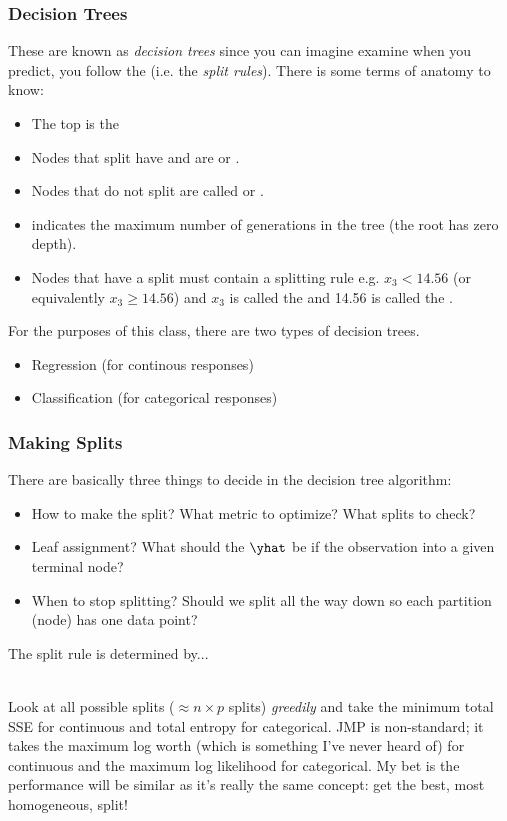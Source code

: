 \documentclass[handout]{beamer}
\begin{document}
\begin{frame}\frametitle{Decision Trees}
\small
These are known as \emph{decision trees} since you can imagine examine when you predict, you follow the  (i.e. the \emph{split rules}). There is some terms of anatomy to know:

\begin{itemize}
\item The top is the 
\item Nodes that split have  and are  or .
\item Nodes that do not split are called  or .
\item {} indicates the maximum number of generations in the tree (the root has zero depth).
\item Nodes that have a split must contain a splitting rule e.g. $x_3 < 14.56$ (or equivalently $x_3 \geq 14.56$) and $x_3$ is called the  and 14.56 is called the .
\end{itemize} \pause


For the purposes of this class, there are two types of decision trees. \pause

\begin{itemize}
\item Regression (for continous responses)
\item Classification (for categorical responses)
\end{itemize} \pause


	
\end{frame}

\begin{frame}\frametitle{Making Splits}
\small
There are basically three things to decide in the decision tree algorithm:

\begin{itemize}
\item How to make the split? What metric to optimize? What splits to check? \pause
\item Leaf assignment? What should the $\yhat$ be if the observation  into a given terminal node?
\item When to stop splitting? Should we split all the way down so each  partition (node) has one data point?
\end{itemize} \pause

The split rule is determined by...\\~\\ \pause

Look at all possible splits ($\approx n \times p$ splits) \emph{greedily} and take the minimum total SSE for continuous and total entropy for categorical. JMP is non-standard; it takes the maximum log worth (which is something I've never heard of) for continuous and the maximum log likelihood for categorical. My bet is the performance will be similar as it's really the same concept: get the best, most homogeneous, split!


\end{frame}
\end{document}
